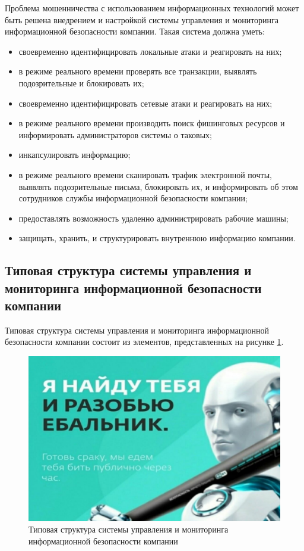 Проблема мошенничества с использованием информационных технологий может быть решена внедрением и настройкой системы управления и мониторинга информационной безопасности компании. Такая система должна уметь:
\begin{itemize}
    \item своевременно идентифицировать локальные атаки и реагировать на них;
    \item в режиме реального времени проверять все транзакции, выявлять подозрительные и блокировать их;
    \item своевременно идентифицировать сетевые атаки и реагировать на них;
    \item в режиме реального времени производить поиск фишинговых ресурсов и информировать администраторов системы о таковых;
    \item инкапсулировать информацию;
    \item в режиме реального времени сканировать трафик электронной почты, выявлять подозрительные письма, блокировать их, и информировать об этом сотрудников службы информационной безопасности компании;
    \item предоставлять возможность удаленно администрировать рабочие машины;
    \item защищать, хранить, и структурировать внутреннюю информацию компании.
\end{itemize}


\subsection{Типовая структура системы управления и мониторинга информационной безопасности компании}

Типовая структура системы управления и мониторинга информационной безопасности компании состоит из элементов, представленных на рисунке \ref{structt}.

\begin{figure}[H]
  \centering
  \includegraphics[width=1\textwidth]{resources/1.jpg}
  \caption{Типовая структура системы управления и мониторинга информационной безопасности компании}
  \label{structt}
\end{figure}


